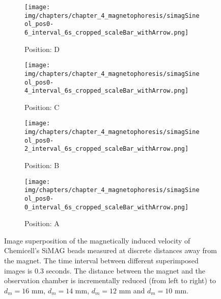 \begin{figure}[htb]
	\centering
	\begin{subfigure}[b]{0.22\textwidth}
		\texttt{[image: img/chapters/chapter\_4\_magnetophoresis/simagSineol\_pos0-6\_interval\_6s\_cropped\_scaleBar\_withArrow.png]}
		\caption{Position: D}
	\end{subfigure}
	\hfill
	\begin{subfigure}[b]{0.22\textwidth}
		\texttt{[image: img/chapters/chapter\_4\_magnetophoresis/simagSineol\_pos0-4\_interval\_6s\_cropped\_scaleBar\_withArrow.png]}
		\caption{Position: C}
	\end{subfigure}
	\hfill
	\begin{subfigure}[b]{0.22\textwidth}
		\texttt{[image: img/chapters/chapter\_4\_magnetophoresis/simagSineol\_pos0-2\_interval\_6s\_cropped\_scaleBar\_withArrow.png]}
		\caption{Position: B}
	\end{subfigure}
	\hfill
	\begin{subfigure}[b]{0.22\textwidth}
		\texttt{[image: img/chapters/chapter\_4\_magnetophoresis/simagSineol\_pos0-0\_interval\_6s\_cropped\_scaleBar\_withArrow.png]}
		\caption{Position: A}
	\end{subfigure}      
	\caption[Magnetically induced velocities of Chemicell's SiMAG beads at different magnetophoretic driving forces]{Image superposition of the magnetically induced velocity of Chemicell's SiMAG beads measured at discrete distances away from the magnet. The time interval between different superimposed images is $0.3$ seconds. The distance between the magnet and the observation chamber is incrementally reduced (from left to right) to $d_{m}=16$ mm, $d_{m}=14$ mm, $d_{m}=12$ mm and $d_{m}=10$ mm.}
        \label{fig:particleMovement_siMag}
\end{figure} 

